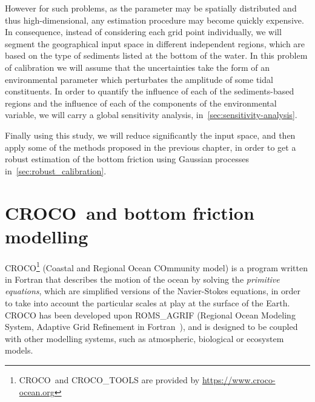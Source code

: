 \documentclass[../../Main_ManuscritThese.tex]{subfiles}
\newcommand{\CROCO}{CROCO}
\begin{document}
However for such problems, as the parameter may be spatially
distributed and thus high-dimensional, any estimation procedure may
become quickly expensive.  In consequence, instead of considering each
grid point individually, we will segment the geographical input space
in different independent regions, which are based on the type of
sediments listed at the bottom of the water. In this problem of
calibration we will assume that the uncertainties take the form of an
environmental parameter which perturbates the amplitude of some tidal
constituents.  In order to quantify the influence of each of the
sediments-based regions and the influence of each of the components of
the environmental variable, we will carry a global sensitivity
analysis, in~\cref{sec:sensitivity-analysis}.

Finally using this study, we will reduce significantly the input
space, and then apply some of the methods proposed in the previous
chapter, in order to get a robust estimation of the bottom friction
using Gaussian processes in~\cref{sec:robust_calibration}.


\section{\CROCO\ and bottom friction modelling}
\label{sec:croco_bottom_fr}
\CROCO{}\footnote{\CROCO\ and CROCO\_TOOLS are provided by
  \url{https://www.croco-ocean.org}} (Coastal and Regional Ocean
COmmunity model) is a program written in Fortran that describes the
motion of the ocean by solving the \emph{primitive equations}, which
are simplified versions of the Navier-Stokes equations, in order to
take into account the particular scales at play at the surface of the
Earth. \CROCO{} has been developed upon
ROMS\_AGRIF %
(Regional Ocean Modeling System, Adaptive Grid Refinement in
Fortran~\cite{debreu_two-way_2012}), and is designed to be coupled with
other modelling systems, such as atmospheric, biological or ecosystem
models.

\end{document}
